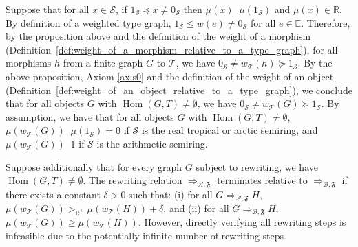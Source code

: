     Suppose that for all $x \mathop{\in} \mathcal{S}$, if $ 1_\mathcal{S} \mathop{\preceq} x \mathop{\neq} 0_\mathcal{S}$ then $\mu(x) \mathop{\geq_{\mathbb{R}^+}} \mu(1_\mathcal{S})$ and $\mu(x) \mathop{\in} \mathbb{R}$. 
    By definition of a weighted type graph, $1_\mathcal{S} \leq w(e)\mathop{\neq} 0_\mathcal{S}$ for all $e\in\mathbb{E}$.
    Therefore, by the proposition above and the definition of the weight of a morphism (Definition~\ref{def:weight_of_a_morphism_relative_to_a_type_graph}), for all morphisms \( h \) from a finite graph $G$ to $\mathcal{T}$, we have \( 0_\mathcal{S} \mathop{\neq} w_\mathcal{T}(h) \mathop{\succeq} 1_\mathcal{S} \). 
    By the above proposition, Axiom \eqref{ax:s0} and the definition of the weight of an object (Definition~\ref{def:weight_of_an_object_relative_to_a_type_graph}), we conclude that for all objects \( G \) with $\operatorname{Hom}(G,T)\mathop{\neq} \emptyset$, we have \( 0_\mathcal{S} \mathop{\neq} w_\mathcal{T}(G) \mathop{\succeq} 1_\mathcal{S} \). By assumption, we have that for all objects \( G \) with $\operatorname{Hom}(G,T)\mathop{\neq} \emptyset$, \( \mu(w_\mathcal{T}(G)) \mathop{\geq_{\mathbb{R}^+}} \mu(1_\mathcal{S}) \mathop{=} 0 \) if $\mathcal{S}$ is the real tropical or arctic semiring, and \( \mu(w_\mathcal{T}(G)) \mathop{\geq_{\mathbb{R}^+}} 1 \) if $\mathcal{S}$ is the arithmetic semiring.

Suppose additionally that for every graph $G$ subject to rewriting, we have $\operatorname{Hom}(G,T)\mathop{\neq} \emptyset$. The rewriting relation \( \mathop{\Rightarrow}_{\mathcal{A},\mathfrak{F}} \) terminates relative to $\mathop{\Rightarrow}_{\mathcal{B},\mathfrak{F}}$ if there exists a constant $\delta \mathop{>} 0$ such that: (i) for all \(G \mathop{\Rightarrow}_{\mathcal{A},\mathfrak{F}} H\), \( \mu(w_\mathcal{T}(G)) >_{\mathbb{R}^+} \mu(w_\mathcal{T}(H))\mathop{+}\delta \), and (ii) for all \(G \mathop{\Rightarrow}_{\mathcal{B},\mathfrak{F}} H\), \( \mu(w_\mathcal{T}(G)) \mathop{\geq} \mu(w_\mathcal{T}(H)) \). However, directly verifying all rewriting steps is infeasible due to the potentially infinite number of rewriting steps.


